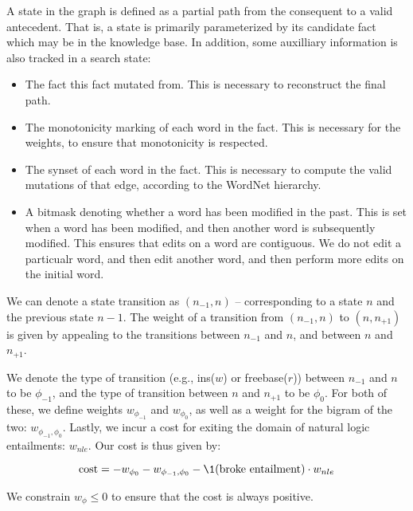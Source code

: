 A state in the graph is defined as a partial path from the consequent to a
  valid antecedent.
That is, a state is primarily parameterized by its candidate fact which may be
  in the knowledge base.
In addition, some auxilliary information is also tracked in a search state:

\begin{itemize}
  \item The fact this fact mutated from.
        This is necessary to reconstruct the final path.
  \item The monotonicity marking of each word in the fact.
        This is necessary for the weights, to ensure that monotonicity is
          respected.
  \item The synset of each word in the fact.
        This is necessary to compute the valid mutations of that edge, according
          to the WordNet hierarchy.
  \item A bitmask denoting whether a word has been modified in the past.
        This is set when a word has been modified, and then another word is
          subsequently modified.
        This ensures that edits on a word are contiguous.
        We do not edit a particualr word, and then edit another word, and then
          perform more edits on the initial word.
\end{itemize}

We can denote a state transition as $(n_{-1}, n)$ -- 
  corresponding to a state $n$ and the previous state $n-1$.
The weight of a transition from $(n_{-1},n)$ to
  $(n,n_{+1})$ is given by appealing to the
  transitions between $n_{-1}$ and $n$, and between
  $n$ and $n_{+1}$.

We denote the type of transition 
  (e.g., ins($w$) or freebase($r$))
  between $n_{-1}$ and $n$ to be $\phi_{-1}$, and the
  type of transition between $n$ and $n_{+1}$ to
  be $\phi_0$.
For both of these, we define weights $w_{\phi_{-1}}$
  and $w_{\phi_0}$, as well as a weight for the
  bigram of the two: $w_{\phi_{-1}, \phi_0}$.
Lastly, we incur a cost for exiting the domain of natural
  logic entailments: $w_{nle}$.
Our cost is thus given by:

\begin{equation}
\textrm{cost} = - w_{\phi_{0}}
                - w_{\phi_{-1}, \phi_0}
                - \1(\textrm{broke entailment}) \cdot w_{nle}
\end{equation}

We constrain $w_{\phi} \leq 0$ to ensure that the
  cost is always positive. 


